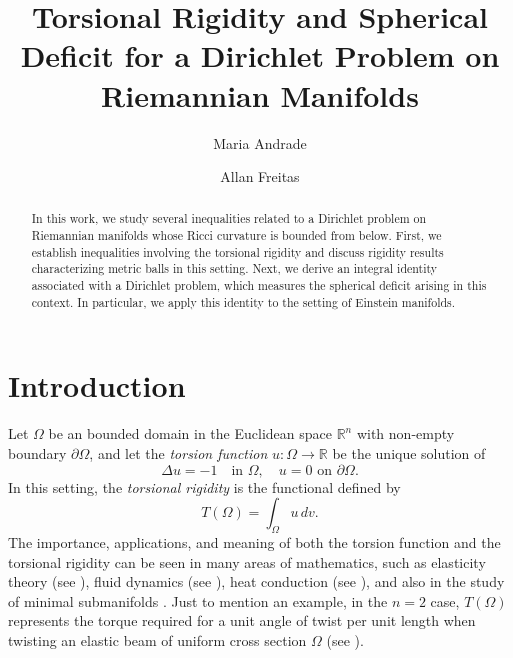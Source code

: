 \documentclass[reqno,11pt]{amsart}
\title[Torsional Rigidity and Spherical Deficit for a Dirichlet Problem]{Torsional Rigidity and Spherical Deficit for a Dirichlet Problem on Riemannian Manifolds}
\author[M. Andrade]{Maria Andrade}
\author[A. Freitas]{Allan Freitas}
\numberwithin{equation}{section}  %
\newcommand{\tcr}{\textcolor{red}}
\begin{document}
\begin{abstract}
In this work, we study several inequalities related to a Dirichlet problem on Riemannian manifolds whose Ricci curvature is bounded from below. First, we establish inequalities involving the torsional rigidity and discuss rigidity results characterizing metric balls in this setting. Next, we derive an integral identity associated with a Dirichlet problem, which measures the spherical deficit arising in this context. In particular, we apply this identity to the setting of Einstein manifolds.
\end{abstract}

\maketitle







\section{Introduction}\label{sec:intro}
Let $\Omega$ be an bounded domain in the Euclidean space $\mathbb{R}^n$ with non-empty boundary $\partial\Omega$, and let the \textit{torsion function} $u : \Omega \to \mathbb{R}$ be the unique solution of
\begin{equation}\label{Dirichlet1}
\Delta u = -1\quad \text{in } \Omega, \quad u = 0 \text{ on } \partial \Omega.    
\end{equation}
In this setting, the \textit{torsional rigidity} is the functional defined by
\begin{equation}
T(\Omega) = \int_{\Omega} u \, dv.  
\end{equation}
The importance, applications, and meaning of both the torsion function and the torsional rigidity can be seen in many areas of mathematics, such as elasticity theory (see \cite{polya1951,sokolniko1956}), fluid dynamics (see \cite{serrin1971}), heat conduction (see \cite{vandenberg1990}), and also in the study of minimal submanifolds \cite{markvorsen2006}.
Just to mention an example, in the $n=2$ case, $T(\Omega)$ represents the torque required for a unit angle of twist per unit
length when twisting an elastic beam of uniform cross section $\Omega$ (see \cite[Pages~109-119]{sokolniko1956}).
\end{document}
